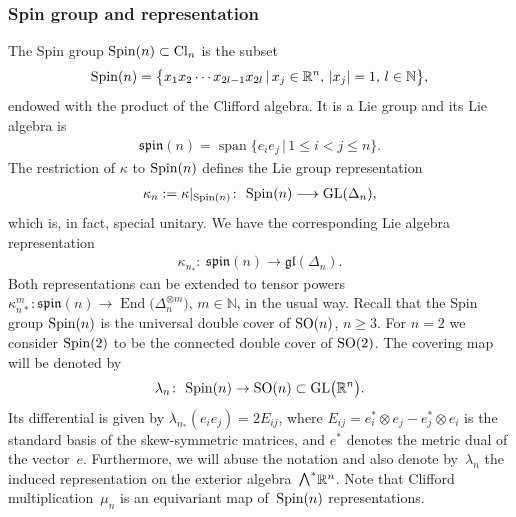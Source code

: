 \documentclass[10pt,a4paper]{amsart}
\newcommand{\ext}{\raise1pt\hbox{\small$\bigwedge$}}
\newcommand{\lra}{\longrightarrow}
\numberwithin{equation}{section}
\begin{document}
\subsubsection{Spin group and representation}
The Spin group ${\rm Spin}(n)\subset {\rm Cl}_n$ is the subset
\begin{gather*} {\rm Spin}(n) =\big\{x_1x_2\cdots x_{2l-1}x_{2l} \,|\, x_j\in\mathbb{R}^n, \, |x_j|=1,\,l\in\mathbb{N}\big\},\end{gather*}
endowed with the product of the Clifford algebra. It is a Lie group and its Lie algebra is
\begin{gather*} \mathfrak{spin}(n)=\operatorname{span} \{e_ie_j\, | \,1\leq i< j \leq n\}.\end{gather*}
The restriction of $\kappa$ to ${\rm Spin}(n)$ defines the Lie group representation
\begin{gather*} \kappa_n:=\kappa|_{{\rm Spin}(n)}\colon \ {\rm Spin}(n)\lra {\rm GL}(\Delta_n),\end{gather*}
which is, in fact, special unitary. We have the corresponding Lie algebra representation
\begin{gather*} \kappa_{n_*}\colon \ \mathfrak{spin}(n)\lra \mathfrak{gl}(\Delta_n).\end{gather*}
Both representations can be extended to tensor powers $\kappa_{n*}^m\colon \mathfrak{spin}(n)\longrightarrow \operatorname{End}\big(\Delta_n^{\otimes m}\big)$, $m\in \mathbb{N}$, in the usual way. Recall that the Spin group ${\rm Spin}(n)$ is the universal double cover of ${\rm SO}(n)$, $n\ge 3$. For $n=2$ we consider ${\rm Spin}(2)$ to be the connected double cover of ${\rm SO}(2)$. The covering map will be denoted by
\begin{gather*} \lambda_n\colon \ {\rm Spin}(n)\rightarrow {\rm SO}(n)\subset {\rm GL}\big(\mathbb{R}^n\big).\end{gather*}
Its differential is given
by $\lambda_{n_*}(e_ie_j) = 2E_{ij}$, where $E_{ij}=e_i^*\otimes e_j - e_j^*\otimes e_i$ is the standard basis of the skew-symmetric matrices, and $e^*$ denotes the metric dual of the vector~$e$. Furthermore, we will abuse the notation and also denote by~$\lambda_n$ the induced representation on the exterior algebra~$\ext^*\mathbb{R}^n$.
Note that Clifford multiplication~$\mu_n$ is an equivariant map of~${\rm Spin}(n)$ representations.
\end{document}
